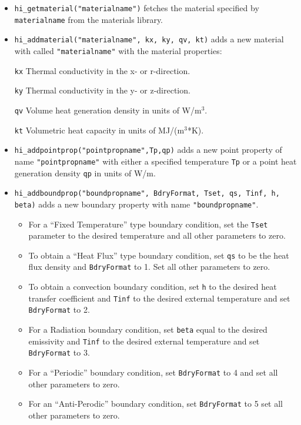 \begin{itemize}
\item \texttt{hi\_getmaterial("materialname")} fetches the material specified by \texttt{materialname} 
from the materials library.

\item \texttt{hi\_addmaterial("materialname", kx, ky, qv, kt)} adds a new material with
called \texttt{"materialname"} with the material properties:

\texttt{kx} Thermal conductivity in the x- or r-direction.

\texttt{ky} Thermal conductivity in the y- or z-direction.

\texttt{qv} Volume heat generation density in units of W/m$^{3}$.

\texttt{kt} Volumetric heat capacity in units of MJ/(m$^{3}$*K).

\item \texttt{hi\_addpointprop("pointpropname",Tp,qp)} adds a new point property of
name \texttt{"pointpropname"} with either a specified temperature
\texttt{Tp} or a point heat generation density \texttt{qp} in units of W/m.

\item \texttt{hi\_addboundprop("boundpropname", BdryFormat, Tset, qs, Tinf, h, beta)}
 adds a new boundary property with name {\tt "boundpropname"}.
\begin{itemize}
\item For a ``Fixed Temperature'' type boundary condition, set the {\tt Tset} parameter to the
desired temperature and all other parameters to zero.
\item To obtain a ``Heat Flux'' type boundary condition, set {\tt qs} to be the heat flux density and
{\tt BdryFormat} to 1. Set all other parameters to zero.
\item To obtain a convection boundary condition, set {\tt h} to the desired heat transfer coefficient and
{\tt Tinf} to the desired external temperature and set {\tt BdryFormat} to 2.
\item For a Radiation boundary condition, set {\tt beta} equal to the desired emissivity and {\tt Tinf} to the 
desired external temperature and set {\tt BdryFormat} to 3.
\item For a ``Periodic'' boundary condition, set {\tt BdryFormat} to 4 and set all other
parameters to zero.
\item For an ``Anti-Perodic'' boundary condition, set {\tt BdryFormat} to 5 set all other
parameters to zero.
\end{itemize}


\end{itemize}
